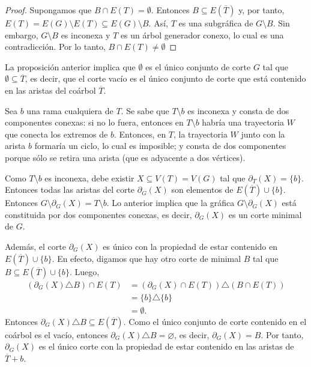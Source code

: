 \begin{proof}
Supongamos que $B \cap E(T) = \emptyset$. Entonces $B \subseteq E(\overline{T})$ y, por tanto,\\ $E(T) = E(G)\setminus E(T) \subseteq E(G) \setminus B$. Así, $T$ es una subgráfica de $G\setminus B$. Sin embargo, $G\setminus B$ es inconexa y $T$ es un árbol generador  conexo, lo cual es una contradicción. Por lo tanto, $B \cap E(T) \neq \emptyset$ 

\end{proof}

La proposición anterior implica que  $\emptyset$ es el único conjunto de corte $G$ tal que  $\emptyset \subseteq \overline{T}$, es decir, que el corte vacío es el único conjunto de corte que está contenido en las aristas del coárbol $\overline{T}$.

Sea $b$ una rama cualquiera de $T$. Se sabe que $T \setminus b$ es inconexa y consta de dos componentes conexas: si no lo fuera, entonces en $T\setminus b$ habría una trayectoria $W$ que conecta los extremos de $b$. Entonces, en $T$, la trayectoria $W$ junto con la arista $b$ formaría un ciclo, lo cual es imposible; y consta de dos componentes porque sólo se retira una arista (que es adyacente a dos vértices).

Como $T \setminus b$ es inconexa, debe existir $X \subseteq V(T)=V(G)$ tal que $\partial_{T}(X) = \{b\}$. Entonces todas las aristas del corte $\partial_{G}(X)$ son elementos de  $E(\overline{T})\cup \{b\}$. Entonces $G\setminus \partial_{G}(X) = T \setminus b$. Lo anterior implica que la gráfica $G \setminus \partial_{G}(X)$ está constituida por dos componentes conexas, es decir, $\partial_{G}(X)$ es un corte minimal de $G$. 

Además, el corte $\partial_{G}(X)$ es único con la propiedad de estar contenido en $E(\overline{T})\cup \{b\}$. En efecto, digamos que hay otro corte de minimal $B$ tal que $B \subseteq E(\overline{T}) \cup \{b\}$. Luego,
\begin{align*}
(\partial_{G}(X) \triangle B) \cap E(T) &= (\partial_{G}(X) \cap E(T))\triangle(B\cap E(T))\\
&= \{b\} \triangle \{b\} \\
&= \emptyset.
\end{align*}
Entonces $\partial_{G}(X)\triangle B \subseteq E(\overline{T})$. Como el único conjunto de corte contenido en el coárbol es el vacío, entonces $\partial_{G}(X)\triangle B = \varnothing$, es decir, $\partial_{G}(X)=B$. Por tanto, $\partial_{G}(X)$ es el único corte con la propiedad de estar contenido en las aristas de $\overline{T}+b$.

